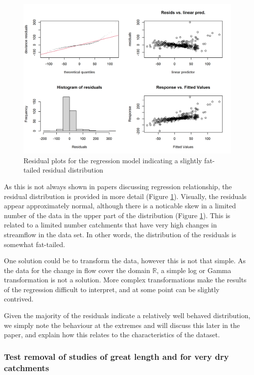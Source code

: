 \documentclass[]{elsarticle} %
\begin{document}
\begin{figure}
\includegraphics[width=0.9\linewidth]{residual_plot_model_all} \caption{Residual plots for the regression model indicating a slightly fat-tailed residual distribution}\label{fig:gamcheckmodelall}
\end{figure}

As this is not always shown in papers discussing regression relationship, the residual distribution is provided in more detail (Figure \ref{fig:gamcheckmodelall}). Visually, the residuals appear approximately normal, although there is a noticable skew in a limited number of the data in the upper part of the distribution (Figure \ref{fig:gamcheckmodelall}). This is related to a limited number catchments that have very high changes in streamflow in the data set. In other words, the distribution of the residuals is somewhat fat-tailed.

One solution could be to transform the data, however this is not that simple. As the data for the change in flow cover the domain \(\mathbb{R}\), a simple log or Gamma transformation is not a solution. More complex transformations make the results of the regression difficult to interpret, and at some point can be slightly contrived.

Given the majority of the residuals indicate a relatively well behaved distribution, we simply note the behaviour at the extremes and will discuss this later in the paper, and explain how this relates to the characteristics of the dataset.

\hypertarget{test-removal-of-studies-of-great-length-and-for-very-dry-catchments}{%
\subsubsection{Test removal of studies of great length and for very dry catchments}\label{test-removal-of-studies-of-great-length-and-for-very-dry-catchments}}
\end{document}
